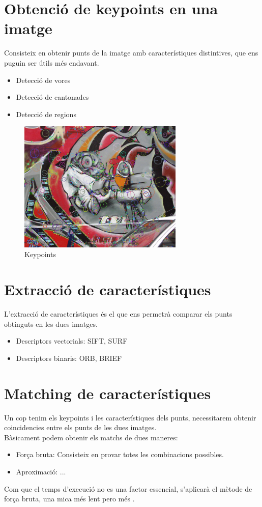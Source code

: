 \section{Obtenció de keypoints en una imatge}
	Consisteix en obtenir punts de la imatge amb característiques distintives, que ens puguin ser útils més endavant.
	\begin{itemize}	
		\item{Detecció de vores}
		\item{Detecció de cantonades}
		\item{Detecció de regions}
	\end{itemize}
	\begin{figure}[H]
		\centering
		\includegraphics[width=0.7\textwidth]{images/RobotKp}
		\caption{Keypoints}
	\end{figure}

\section{Extracció de característiques}

	L'extracció de característiques és el que ens permetrà comparar els punts obtinguts en les dues imatges.
	\begin{itemize}
		\item{Descriptors vectorials: SIFT, SURF}
		\item{Descriptors binaris: ORB, BRIEF}
	\end{itemize}

\newpage
\section{Matching de característiques}

	Un cop tenim els keypoints i les característiques dels punts, necessitarem obtenir coincidencies entre els punts de les dues imatges.\\
	Bàsicament podem obtenir els matchs de dues maneres:\\
	\begin{itemize}	
		\item{Força bruta: Consisteix en provar totes les combinacions possibles.}
		\item{Aproximació: ...}
	\end{itemize}
	Com que el temps d'execució no es una factor essencial, s'aplicarà el mètode de força bruta, una mica més lent pero més .

